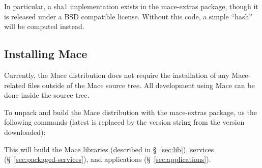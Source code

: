 In particular, a sha1 implementation exists in the mace-extras package, though
it is released under a BSD compatible license.  Without this code, a simple
``hash'' will be computed instead.

\subsection{Installing Mace}
\label{sec:unpacking}

Currently, the Mace distribution does not require the installation of any
Mace-related files outside of the Mace source tree.  All development using Mace
can be done inside the source tree.

To unpack and build the Mace distribution with the mace-extras package, us the
following commands (latest is replaced by the version string from the version
downloaded):

\begin{screen}
\end{screen}

This will build the Mace libraries (described in
\S~\ref{sec:lib}), services
(\S~\ref{sec:packaged-services}), and applications
(\S~\ref{sec:applications}).

